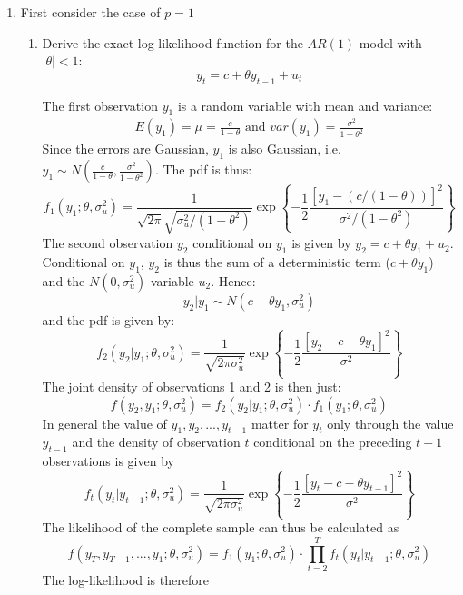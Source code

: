\documentclass[a4paper]{scrartcl}
\begin{document}
    \begin{enumerate}
        \item First consider the case of $p=1$
              \begin{enumerate}
                  \item Derive the exact log-likelihood function for the $AR(1)$ model with $|\theta|<1$:
                        $$y_t = c + \theta y_{t-1} + u_t$$
                        \begin{solution}
                            The first observation $y_1$ is a random variable with mean and variance:
                            \begin{align*}
                                E(y_1) = \mu = \frac{c}{1-\theta} \text{ and } var(y_1) = \frac{\sigma^2}{1-\theta^2}
                            \end{align*}
                            Since the errors are Gaussian, $y_1$ is also Gaussian, i.e. $y_1 \sim N\left(\frac{c}{1-\theta},\frac{\sigma^2}{1-\theta^2}\right)$. The pdf is thus:
                            $$f_1(y_1;\theta,\sigma_u^2) = \frac{1}{\sqrt{2\pi}\sqrt{\sigma_u^2/(1-\theta^2)}}\exp\left\{-\frac{1}{2}\frac{[y_1-(c/(1-\theta))]^2}{\sigma^2/(1-\theta^2)}\right\}$$
                            The second observation $y_2$ conditional on $y_1$ is given by $y_2 = c + \theta y_1 + u_2$. Conditional on $y_1$, $y_2$ is thus the sum of a deterministic term ($c+\theta y_1$) and the $N(0,\sigma_u^2)$ variable $u_2$. Hence:
                            $$ y_2|y_1 \sim N(c+\theta y_1,\sigma_u^2)$$ and the pdf is given by:
                            $$f_2(y_2|y_1;\theta,\sigma_u^2) = \frac{1}{\sqrt{2\pi\sigma_u^2}}\exp\left\{-\frac{1}{2}\frac{[y_2-c-\theta y_1]^2}{\sigma^2}\right\}$$
                            The joint density of observations 1 and 2 is then just:
                            $$f(y_2,y_1;\theta,\sigma_u^2) = f_2(y_2|y_1;\theta,\sigma_u^2)\cdot f_1(y_1;\theta,\sigma_u^2)$$
                            In general the value of $y_1,y_2,...,y_{t-1}$ matter for $y_t$ only through the value $y_{t-1}$ and the density of observation $t$ conditional on the preceding $t-1$ observations is given by
                            $$f_t(y_t|y_{t-1};\theta,\sigma_u^2) = \frac{1}{\sqrt{2\pi\sigma_u^2}}\exp\left\{-\frac{1}{2}\frac{[y_t-c-\theta y_{t-1}]^2}{\sigma^2}\right\}$$
                            The likelihood of the complete sample can thus be calculated as
                            $$f(y_T,y_{T-1},...,y_1;\theta,\sigma_u^2)=f_1(y_1;\theta,\sigma_u^2)\cdot \prod_{t=2}^{T}f_t(y_t|y_{t-1};\theta,\sigma_u^2)$$ The log-likelihood is therefore

\end{solution}
\end{enumerate}
\end{enumerate}
\end{document}
